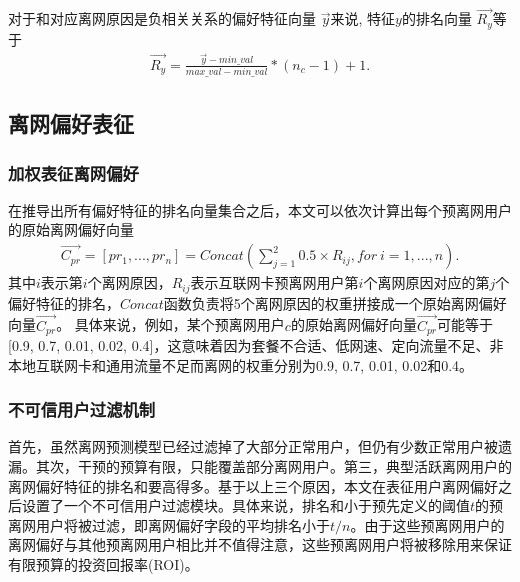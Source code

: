 对于和对应离网原因是负相关关系的偏好特征向量 $\vec{y}$来说, 特征$y$的排名向量 $\overrightarrow{R_y}$等于
\begin{equation}
	\begin{aligned}
		\overrightarrow{R_y} = \frac{\vec{y}-min\_val}{max\_val-min\_val}*(n_{c} - 1) + 1.
	\end{aligned}
	\label{Eq:Negative-Binning}
\end{equation}	

\subsection{离网偏好表征}
\subsubsection{加权表征离网偏好}
在推导出所有偏好特征的排名向量集合之后，本文可以依次计算出每个预离网用户的原始离网偏好向量
\begin{equation}
	\begin{aligned}
		\overrightarrow{C_{pr}} =[pr_{1}, ..., pr_{n}] = Concat(\sum_{j=1}^{2} 0.5 \times R_{ij}, for ~ i=1, ..., n).
	\end{aligned}
	\label{Eq:Churn-Preference-Representation}
\end{equation}	
其中$i$表示第$i$个离网原因，$R_{ij}$表示互联网卡预离网用户第$i$个离网原因对应的第$j$个偏好特征的排名，$Concat$函数负责将5个离网原因的权重拼接成一个原始离网偏好向量$\overrightarrow{C_{pr}}$。
具体来说，例如，某个预离网用户$c$的原始离网偏好向量$\overrightarrow{C_{pr}}$可能等于[0.9, 0.7, 0.01, 0.02, 0.4]，这意味着因为套餐不合适、低网速、定向流量不足、非本地互联网卡和通用流量不足而离网的权重分别为0.9, 0.7, 0.01, 0.02和0.4。

\subsubsection{不可信用户过滤机制}
首先，虽然离网预测模型已经过滤掉了大部分正常用户，但仍有少数正常用户被遗漏。其次，干预的预算有限，只能覆盖部分离网用户。第三，典型活跃离网用户的离网偏好特征的排名和要高得多。基于以上三个原因，本文在表征用户离网偏好之后设置了一个不可信用户过滤模块。具体来说，排名和小于预先定义的阈值$t$的预离网用户将被过滤，即离网偏好字段的平均排名小于$t/n$。由于这些预离网用户的离网偏好与其他预离网用户相比并不值得注意，这些预离网用户将被移除用来保证有限预算的投资回报率(ROI)。

